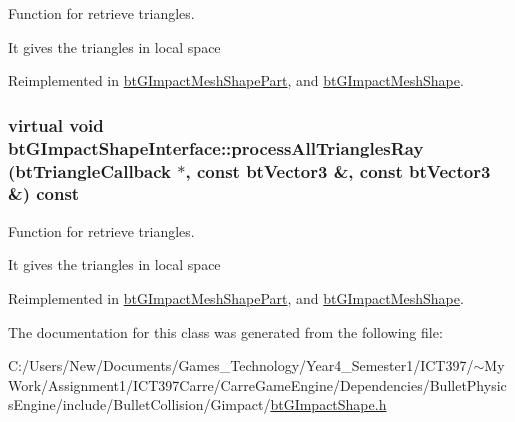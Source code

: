 Function for retrieve triangles. 

It gives the triangles in local space 

Reimplemented in \hyperlink{classbt_g_impact_mesh_shape_part_230a814ad9f784638e8bcbf0592cdd39}{btGImpactMeshShapePart}, and \hyperlink{classbt_g_impact_mesh_shape_0b3a0f7b06feb5e2e1fa94f2b5fcd4c7}{btGImpactMeshShape}.\hypertarget{classbt_g_impact_shape_interface_646ad13b4aa116d58df110c2f407e5a8}{
\subsubsection[processAllTrianglesRay]{\setlength{\rightskip}{0pt plus 5cm}virtual void btGImpactShapeInterface::processAllTrianglesRay ({\bf btTriangleCallback} $\ast$, \/  const btVector3 \&, \/  const btVector3 \&) const}}
\label{classbt_g_impact_shape_interface_646ad13b4aa116d58df110c2f407e5a8}


Function for retrieve triangles. 

It gives the triangles in local space 

Reimplemented in \hyperlink{classbt_g_impact_mesh_shape_part_0e35b55bd50911911f8164cf3a2dd5c8}{btGImpactMeshShapePart}, and \hyperlink{classbt_g_impact_mesh_shape_80b60d4ca87b2739b2389258e901900d}{btGImpactMeshShape}.

The documentation for this class was generated from the following file:\begin{CompactItemize}
\item 
C:/Users/New/Documents/Games\_\-Technology/Year4\_\-Semester1/ICT397/$\sim$My Work/Assignment1/ICT397Carre/CarreGameEngine/Dependencies/BulletPhysicsEngine/include/BulletCollision/Gimpact/\hyperlink{bt_g_impact_shape_8h}{btGImpactShape.h}\end{CompactItemize}
